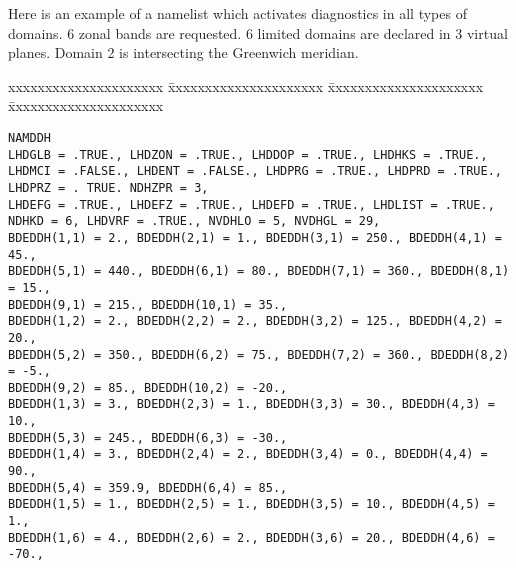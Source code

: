 Here is an example of a namelist which activates diagnostics in all types of domains.
6 zonal bands are requested. 6 limited domains are declared in 3 virtual planes. Domain 2 is intersecting the Greenwich meridian.
\begin{tabbing}
xxxxxxxxxxxxxxxxxxxxx \= xxxxxxxxxxxxxxxxxxxxx \= xxxxxxxxxxxxxxxxxxxxx \= xxxxxxxxxxxxxxxxxxxxx \kill 

\tt NAMDDH \\
\tt LHDGLB = .TRUE., \> \tt LHDZON = .TRUE., \> \tt LHDDOP = .TRUE., \> \tt LHDHKS = .TRUE., \\
\tt LHDMCI = .FALSE., \> \tt LHDENT = .FALSE., \>\tt LHDPRG = .TRUE., \> \tt LHDPRD = .TRUE., \\
\tt LHDPRZ = . TRUE. \> \tt NDHZPR = 3, \\
\tt LHDEFG = .TRUE., \> \tt LHDEFZ = .TRUE., \> \tt LHDEFD = .TRUE., \> \tt LHDLIST = .TRUE., \\
\tt NDHKD = 6, \> \tt LHDVRF = .TRUE., \> \tt NVDHLO = 5, \> \tt NVDHGL = 29, \\
\tt BDEDDH(1,1) = 2., \> \tt BDEDDH(2,1) = 1., \> \tt BDEDDH(3,1) = 250., \> \tt BDEDDH(4,1) = 45., \\
\tt BDEDDH(5,1) = 440., \> \tt BDEDDH(6,1) = 80., \> \tt BDEDDH(7,1) = 360., \> \tt BDEDDH(8,1) = 15., 
\\
\tt BDEDDH(9,1) = 215., \> \tt BDEDDH(10,1) = 35., \\
\tt BDEDDH(1,2) = 2., \> \tt BDEDDH(2,2) = 2., \> \tt BDEDDH(3,2) = 125., \> \tt BDEDDH(4,2) = 20., \\
\tt BDEDDH(5,2) = 350., \> \tt BDEDDH(6,2) = 75., \> \tt BDEDDH(7,2) = 360., \> \tt BDEDDH(8,2) = -5., 
\\
\tt BDEDDH(9,2) = 85., \> \tt BDEDDH(10,2) = -20., \\
\tt BDEDDH(1,3) = 3., \> \tt BDEDDH(2,3) = 1., \> \tt BDEDDH(3,3) = 30., \> \tt BDEDDH(4,3) = 10., \\
\tt BDEDDH(5,3) = 245., \> \tt BDEDDH(6,3) = -30., \\
\tt BDEDDH(1,4) = 3., \> \tt BDEDDH(2,4) = 2., \> \tt BDEDDH(3,4) = 0., \> \tt BDEDDH(4,4) = 90., \\
\tt BDEDDH(5,4) = 359.9, \> \tt BDEDDH(6,4) = 85., \\
\tt BDEDDH(1,5) = 1., \> \tt BDEDDH(2,5) = 1., \> \tt BDEDDH(3,5) = 10., \> \tt BDEDDH(4,5) = 1., \\
\tt BDEDDH(1,6) = 4., \> \tt BDEDDH(2,6) = 2., \> \tt BDEDDH(3,6) = 20., \> \tt BDEDDH(4,6) = -70.,

\end{tabbing}

